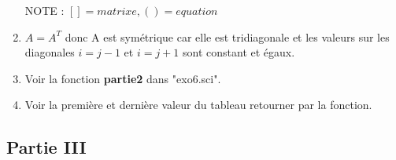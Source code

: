 \documentclass[12pt, letterpaper]{article}
\begin{document}
\begin{enumerate}
    NOTE : $[] = matrixe, () = equation$


  \item
    $A = A^T$ donc A est symétrique car elle est tridiagonale et les
    valeurs sur les diagonales $i = j - 1$ et $i = j + 1$ sont
    constant et égaux.

  \item
    Voir la fonction \textbf{partie2} dans "exo6.sci".

  \item
    Voir la première et dernière valeur du tableau retourner par la fonction.
  
\end{enumerate}

\subsection*{Partie III}
\end{document}
